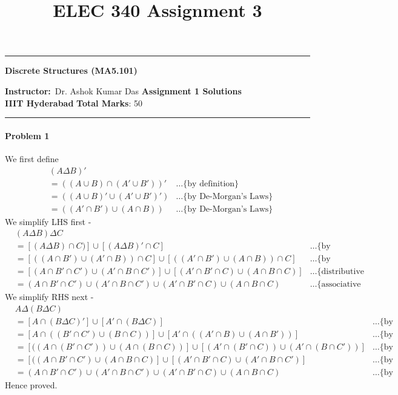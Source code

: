 \documentclass[12pt]{scrartcl}
\title{ELEC 340 Assignment 3}
\begin{document}
\begin{center}
\specialrule{0.02em}{}{}
\hrule
\vspace{0.3cm}
	{\textbf { \large {Discrete Structures (MA5.101) }}} 
\end{center}
\textbf{Instructor:}\ Dr. Ashok Kumar Das \hspace{\fill}\textbf{Assignment 1 Solutions}    \\
{\textbf{IIIT Hyderabad}   } \hspace{\fill} \textbf{Total Marks}: 50 \\ 
\specialrule{0.01em}{}{}
\hrule

\paragraph*{Problem 1}
\small{We first define 
\begin{align*}
    & (A \Delta B)' &
    \\ &= ((A \cup B) \cap (A' \cup B'))' & \ldots \text{\{by definition\}}
    \\ &= ((A \cup B)' \cup (A' \cup B')') & \ldots \text{\{by De-Morgan's Laws\}}
    \\ &= ((A' \cap B') \cup (A \cap B)) & \ldots \text{\{by De-Morgan's Laws\}}
\end{align*}
We simplify LHS first -
\begin{align*}
    & (A \Delta B) {\Delta} C  & 
    \\ &= [(A {\Delta} B) \cap C)] \cup [(A {\Delta} B)' \cap C] & \ldots \text{\{by definition.\}}
    \\ &= [((A \cap B') \cup (A' \cap B)) {\cap} C] \cup [((A' \cap B') \cup (A \cap B)) {\cap} C] & \ldots \text{\{by definition.\}}
    \\ &= [(A \cap B' \cap C') \cup (A' \cap B \cap C')] \cup [(A' \cap B' \cap C) \cup (A \cap B \cap C)] & \ldots \text{\{distributive property\}}
    \\ &= (A \cap B' \cap C') \cup (A' \cap B \cap C') \cup(A' \cap B' \cap C) \cup (A \cap B \cap C)  & \ldots \text{\{associative property\}}
\end{align*}
We simplify RHS next - 
\begin{align*}
    & A {\Delta} (B {\Delta} C)  & 
    \\ &= [A \cap (B \Delta C)'] \cup [A' \cap (B \Delta C)] & \ldots \text{\{by definition\}}
    \\ &= [A \cap ((B' \cap C') \cup (B \cap C))] \cup [A' \cap ((A' \cap B) \cup (A \cap B'))] & \ldots \text{\{by definition\}}
    \\ &= [ ((A \cap (B' \cap C')) \cup (A \cap (B \cap C))] \cup [(A' \cap (B' \cap C)) \cup (A' \cap (B \cap C'))] & \ldots \text{\{by distributive property\}}
    \\ &= [ ((A \cap B' \cap C') \cup (A \cap B \cap C)] \cup [(A' \cap B' \cap C) \cup (A' \cap B \cap C')] & \ldots \text{\{by associative property\}}
    \\ &= (A \cap B' \cap C') \cup (A' \cap B \cap C') \cup(A' \cap B' \cap C) \cup (A \cap B \cap C) & \ldots \text{\{by commutative property\}}
\end{align*}
Hence proved.
}
\end{document}
